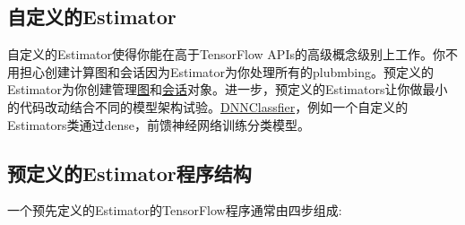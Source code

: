 \subsection{自定义的Estimator}
自定义的Estimator使得你能在高于TensorFlow APIs的高级概念级别上工作。你不用担心创建计算图和会话因为Estimator为你处理所有的plubmbing。预定义的Estimator为你创建管理\href{https://www.tensorflow.org/api_docs/python/tf/Graph?hl=zh-cn}{图}和\href{https://www.tensorflow.org/api_docs/python/tf/Session?hl=zh-cn}{会话}对象。进一步，预定义的Estimators让你做最小的代码改动结合不同的模型架构试验。\href{https://www.tensorflow.org/api_docs/python/tf/estimator/DNNClassifier?hl=zh-cn}{DNNClassfier}，例如一个自定义的Estimators类通过dense，前馈神经网络训练分类模型。
\subsection{预定义的Estimator程序结构}
一个预先定义的Estimator的TensorFlow程序通常由四步组成:

